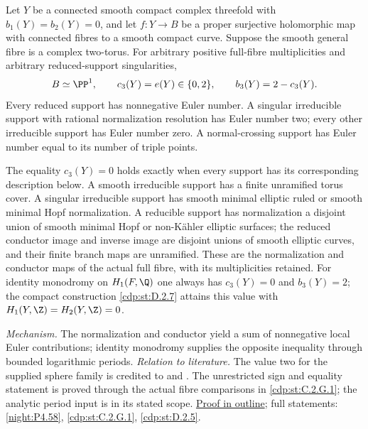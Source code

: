 \hypertarget{main-II-C}{}
\begin{maintheorem}
\hypertarget{tag-03K4}{}\label{series:II:C}

Let $Y$ be a connected smooth compact complex threefold with
$b_1(Y)=b_2(Y)=0$, and let $f:Y\to B$ be a proper surjective
holomorphic map with connected fibres to a smooth compact curve.
Suppose the smooth general fibre is a complex two-torus. For
arbitrary positive full-fibre multiplicities and arbitrary
reduced-support singularities,
\[
 B\simeq\PP^1,\qquad
 c_3(Y)=e(Y)\in\{0,2\},\qquad b_3(Y)=2-c_3(Y).
\]
Every reduced support has nonnegative Euler number. A singular
irreducible support with rational normalization resolution has
Euler number two; every other irreducible support has Euler
number zero. A normal-crossing support has Euler number equal
to its number of triple points.

The equality $c_3(Y)=0$ holds exactly when every support has its
corresponding description below. A smooth irreducible support
has a finite unramified torus cover. A singular irreducible support
has smooth minimal elliptic ruled or smooth minimal Hopf
normalization. A reducible support has normalization a disjoint
union of smooth minimal Hopf or non-K\"ahler elliptic surfaces;
the reduced conductor image and inverse image are disjoint unions
of smooth elliptic curves, and their finite branch maps are
unramified. These are the normalization and conductor maps of
the actual full fibre, with its multiplicities retained.
For identity monodromy on $H_1(F,\Q)$ one always has
$c_3(Y)=0$ and $b_3(Y)=2$; the compact construction
\ref{cdp:st:D.2.7} attains this value with
$H_1(Y,\Z)=H_2(Y,\Z)=0$.

\end{maintheorem}

\textit{Mechanism.} The normalization and conductor yield a sum of
nonnegative local Euler contributions; identity monodromy supplies
the opposite inequality through bounded logarithmic periods.
\textit{Relation to literature.} The value two for the supplied
sphere family is credited to \cite[Theorem~7.22, p.~60]{AC26}
and \cite[Proposition~7.1]{Engel2026}. The unrestricted sign and
equality statement is proved through the actual fibre comparisons
in \ref{cdp:st:C.2.G.1}; the analytic period input is
\cite[\S2, pp.~234--239]{Steenbrink1976} in its stated scope.
\hyperlink{outline-II-C}{Proof in outline}; full statements:
\ref{night:P4.58}, \ref{cdp:st:C.2.G.1}, \ref{cdp:st:D.2.5}.

